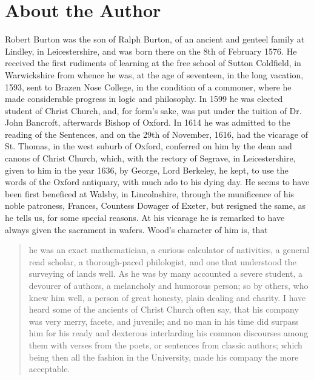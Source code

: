 \chapter{About the Author}
Robert Burton was the son of Ralph Burton, of an ancient and genteel family at Lindley, in Leicestershire, and was born there on the 8th of February 1576.
He received the first rudiments of learning at the free school of Sutton Coldfield, in Warwickshire from whence he was, at the age of seventeen, in the long vacation, 1593, sent to Brazen Nose College, in the condition of a commoner, where he made considerable progress in logic and philosophy.
In 1599 he was elected student of Christ Church, and, for form's sake, was put under the tuition of Dr. John Bancroft, afterwards Bishop of Oxford.
In 1614 he was admitted to the reading of the Sentences, and on the 29th of November, 1616, had the vicarage of St. Thomas, in the west suburb of Oxford, conferred on him by the dean and canons of Christ Church, which, with the rectory of Segrave, in Leicestershire, given to him in the year 1636, by George, Lord Berkeley, he kept, to use the words of the Oxford antiquary, with much ado to his dying day.
He seems to have been first beneficed at Walsby, in Lincolnshire, through the munificence of his noble patroness, Frances, Countess Dowager of Exeter, but resigned the same, as he tells us, for some special reasons.
At his vicarage he is remarked to have always given the sacrament in wafers.
Wood's character of him is, that \blockquote{he was an exact mathematician, a curious calculator of nativities, a general read scholar, a thorough-paced philologist, and one that understood the surveying of lands well.
As he was by many accounted a severe student, a devourer of authors, a melancholy and humorous person; so by others, who knew him well, a person of great honesty, plain dealing and charity.
I have heard some of the ancients of Christ Church often say, that his company was very merry, facete, and juvenile; and no man in his time did surpass him for his ready and dexterous interlarding his common discourses among them with verses from the poets, or sentences from classic authors; which being then all the fashion in the University, made his company the more acceptable.}

